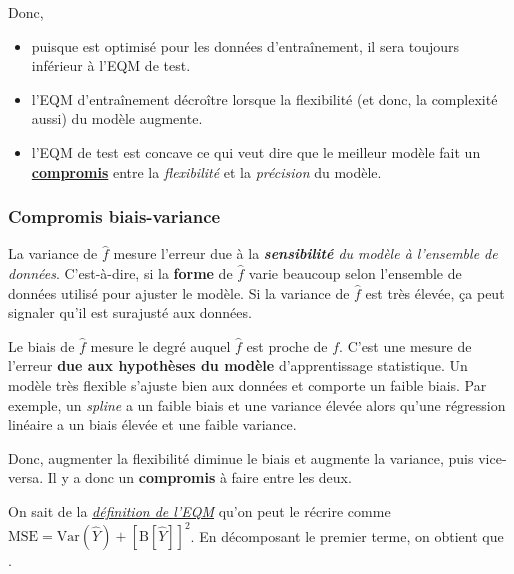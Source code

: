 \documentclass[french]{article}
\begin{document}
\begin{multicols*}{2}
Donc, 
\begin{itemize}
	\item	puisque est optimisé pour les données d'entraînement, il sera toujours inférieur à l'EQM de test.
	\item	l'EQM d'entraînement décroître lorsque la flexibilité (et donc, la complexité aussi) du modèle augmente.
	\item	l'EQM de test est concave ce qui veut dire que le meilleur modèle fait un \textbf{\underline{compromis}} entre la \textit{flexibilité} et la \textit{précision} du modèle.
\end{itemize}

\subsubsection{Compromis biais-variance}\label{subsubsec:BVtradeoff}
\begin{rappel_enhanced}[Contexte]
La variance de $\hat{f}$ mesure l'erreur due à la \textit{\textbf{sensibilité} du modèle à l'ensemble de données}. C'est-à-dire, si la \textbf{forme} de $\hat{f}$ varie beaucoup selon l'ensemble de données utilisé pour ajuster le modèle. Si la variance de $\hat{f}$ est très élevée, ça peut signaler qu'il est surajusté aux données. 

\bigskip

Le biais de $\hat{f}$ mesure le degré auquel $\hat{f}$ est proche de $f$. C'est une mesure de l'erreur \textbf{due aux hypothèses du modèle} d'apprentissage statistique. Un modèle très flexible s'ajuste bien aux données et comporte un faible biais. Par exemple, un \og \textit{spline} \fg{} a un faible biais et une variance élevée alors qu'une régression linéaire a un biais élevée et une faible variance.

\bigskip

Donc, augmenter la flexibilité diminue le biais et augmente la variance, puis vice-versa. Il y a donc un \textbf{compromis} à faire entre les deux.
\end{rappel_enhanced}

On sait de la \textcolor{bleudefrance}{\textit{\underline{\hyperref[subsubsec:EQMQuality]{\textcolor{bleudefrance}{définition de l'EQM}}}}} qu'on peut le récrire comme $\text{MSE} = \text{Var}(\hat{Y}) + \left[\text{B}[\hat{Y}]\right]^{2}$. En décomposant le premier terme, on obtient que .

\bigskip


\end{multicols*}
\end{document}
